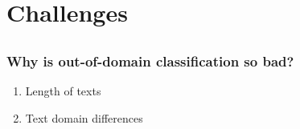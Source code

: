 \documentclass[]{beamer}
\begin{document}
\section{Challenges}
\subsection{}

\begin{frame}\frametitle{Why is out-of-domain classification so bad?}
\begin{enumerate}
\item Length of texts
\vspace{2em}
\item Text domain differences
\end{enumerate}
\end{frame}
\end{document}
